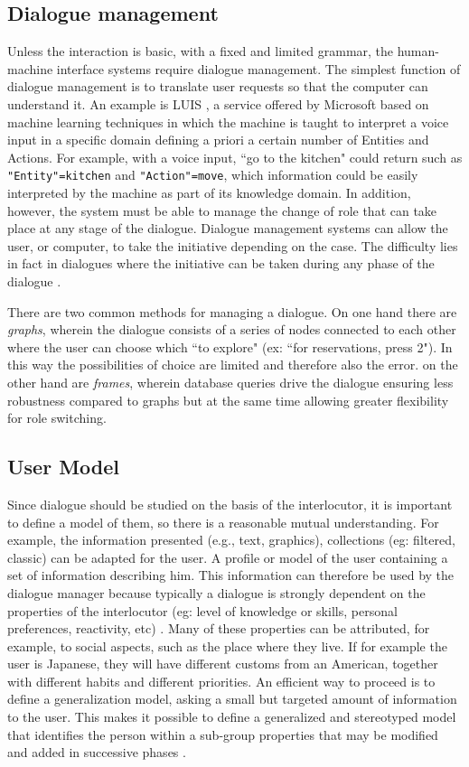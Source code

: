 \documentclass{thesisreport}
\begin{document}
 \subsection{Dialogue management}
 Unless the interaction is basic, with a fixed and limited grammar, the human-machine interface systems require dialogue management.
 The simplest function of dialogue management is to translate user requests so that the computer can understand it. An example is LUIS \cite{williams2015fast}, a service offered by Microsoft based on machine learning techniques in which the machine is taught to interpret a voice input in a specific domain defining a priori a certain number of Entities and Actions. For example, with a voice input, ``go to the kitchen" could return such as \texttt{"Entity"=kitchen} and \texttt{"Action"=move}, which information could be easily interpreted by the machine as part of its knowledge domain.
 In addition, however, the system must be able to manage the change of role that can take place at any stage of the dialogue. Dialogue management systems can allow the user, or computer, to take the initiative depending on the case. The difficulty lies in fact in dialogues where the initiative can be taken during any phase of the dialogue \cite{churcher1997dialogue}.

 There are two common methods for managing a dialogue. On one hand there are \emph{graphs}, wherein the dialogue consists of a series of nodes connected to each other where the user can choose which ``to explore" (ex: ``for reservations, press 2"). In this way the possibilities of choice are limited and therefore also the error. on the other hand are \emph{frames}, wherein database queries drive the dialogue ensuring less robustness compared to graphs but at the same time allowing greater flexibility for role switching.
 
 \subsection{User Model}
 Since dialogue should be studied on the basis of the interlocutor, it is important to define a model of them, so there is a reasonable mutual understanding. For example, the information presented (e.g., text, graphics), collections (eg: filtered, classic) can be adapted for the user. A profile or model of the user containing a set of information describing him. This information can therefore be used by the dialogue manager because typically a dialogue is strongly dependent on the properties of the interlocutor (eg: level of knowledge or skills, personal preferences, reactivity, etc) \cite{fong2001collaboration}.
 Many of these properties can be attributed, for example, to social aspects, such as the place where they live. If for example the user is Japanese, they will have different customs from an American, together with different habits and different priorities. An efficient way to proceed is to define a generalization model, asking a small but targeted amount of information to the user. This makes it possible to define a generalized and stereotyped model that identifies the person within a sub-group properties that may be modified and added in successive phases \cite{fong2001collaboration}.
\end{document}
